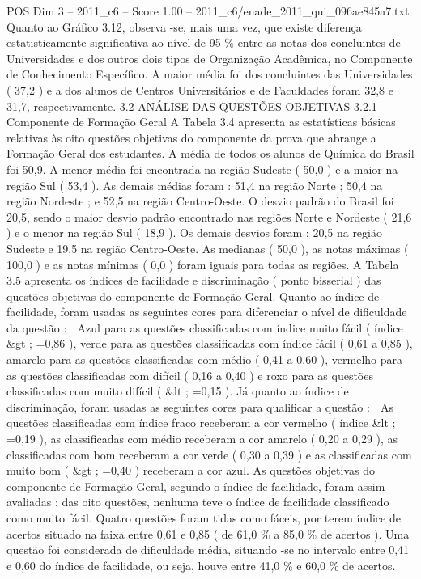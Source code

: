 \begin{textsample}{POS Dim 3 – 2011\_c6 – Score 1.00 – 2011\_c6/enade\_2011\_qui\_096ae845a7.txt}
Quanto ao Gráfico 3.12, observa -se, mais uma vez, que existe diferença estatisticamente significativa ao nível de 95 \% entre as notas dos concluintes de Universidades e dos outros dois tipos de Organização Acadêmica, no Componente de Conhecimento Específico.
A maior média foi dos concluintes das Universidades ( 37,2 ) e a dos alunos de Centros Universitários e de Faculdades foram 32,8 e 31,7, respectivamente. 3.2 ANÁLISE DAS QUESTÕES OBJETIVAS 3.2.1 Componente de Formação Geral A Tabela 3.4 apresenta as estatísticas básicas relativas às oito questões objetivas do componente da prova que abrange a Formação Geral dos estudantes.
A média de todos os alunos de Química do Brasil foi 50,9.
A menor média foi encontrada na região Sudeste ( 50,0 ) e a maior na região Sul ( 53,4 ).
As demais médias foram : 51,4 na região Norte ; 50,4 na região Nordeste ; e 52,5 na região Centro-Oeste.
O desvio padrão do Brasil foi 20,5, sendo o maior desvio padrão encontrado nas regiões Norte e Nordeste ( 21,6 ) e o menor na região Sul ( 18,9 ).
Os demais desvios foram : 20,5 na região Sudeste e 19,5 na região Centro-Oeste.
As medianas ( 50,0 ), as notas máximas ( 100,0 ) e as notas mínimas ( 0,0 ) foram iguais para todas as regiões.
A Tabela 3.5 apresenta os índices de facilidade e discriminação ( ponto bisserial ) das questões objetivas do componente de Formação Geral.
Quanto ao índice de facilidade, foram usadas as seguintes cores para diferenciar o nível de dificuldade da questão :  Azul para as questões classificadas com índice muito fácil ( índice \&gt ; =0,86 ), verde para as questões classificadas com índice fácil ( 0,61 a 0,85 ), amarelo para as questões classificadas com médio ( 0,41 a 0,60 ), vermelho para as questões classificadas com difícil ( 0,16 a 0,40 ) e roxo para as questões classificadas com muito difícil ( \&lt ; =0,15 ).
Já quanto ao índice de discriminação, foram usadas as seguintes cores para qualificar a questão :  As questões classificadas com índice fraco receberam a cor vermelho ( índice \&lt ; =0,19 ), as classificadas com médio receberam a cor amarelo ( 0,20 a 0,29 ), as classificadas com bom receberam a cor verde ( 0,30 a 0,39 ) e as classificadas com muito bom ( \&gt ; =0,40 ) receberam a cor azul.
As questões objetivas do componente de Formação Geral, segundo o índice de facilidade, foram assim avaliadas : das oito questões, nenhuma teve o índice de facilidade classificado como muito fácil.
Quatro questões foram tidas como fáceis, por terem índice de acertos situado na faixa entre 0,61 e 0,85 ( de 61,0 \% a 85,0 \% de acertos ).
Uma questão foi considerada de dificuldade média, situando -se no intervalo entre 0,41 e 0,60 do índice de facilidade, ou seja, houve entre 41,0 \% e 60,0 \% de acertos.

\end{textsample}
